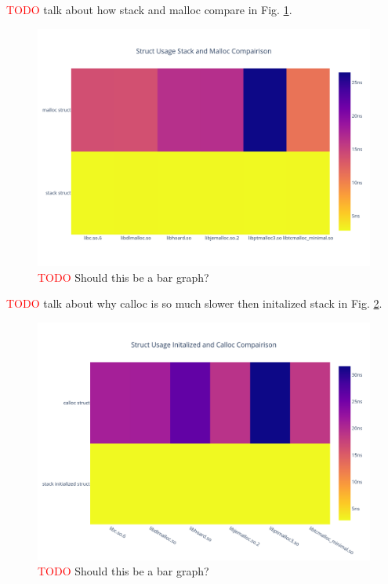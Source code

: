 \documentclass[letterpaper, 10 pt, conference]{ieeeconf}  %
\newcommand*\todo[0]{\textcolor{red}{TODO }}
\begin{document}
\todo talk about how stack and malloc compare in Fig. \ref{algo2_stack_malloc_hist}.

\begin{figure}[tbh!]
  \centering
  \includegraphics[width=\columnwidth]{graphs/struct_stack_malloc_hist.png}
  \caption{ \todo Should this be a bar graph? }
  \label{algo2_stack_malloc_hist}
\end{figure}

\todo talk about why calloc is so much slower then initalized stack in Fig. \ref{algo2_init_calloc_hist}.

\begin{figure}[tbh!]
  \centering
  \includegraphics[width=\columnwidth]{graphs/struct_init_calloc_hist.png}
  \caption{ \todo Should this be a bar graph? }
  \label{algo2_init_calloc_hist}
\end{figure} 
\end{document}
